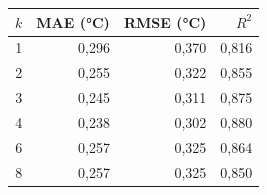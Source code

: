 \begin{tabular}{rrrr}
\toprule
$k$ & MAE (°C) & RMSE (°C) & $R^2$ \\
\midrule
1 & 0,296 & 0,370 & 0,816 \\
2 & 0,255 & 0,322 & 0,855 \\
3 & 0,245 & 0,311 & 0,875 \\
4 & 0,238 & 0,302 & 0,880 \\
6 & 0,257 & 0,325 & 0,864 \\
8 & 0,257 & 0,325 & 0,850 \\
\bottomrule
\end{tabular}
